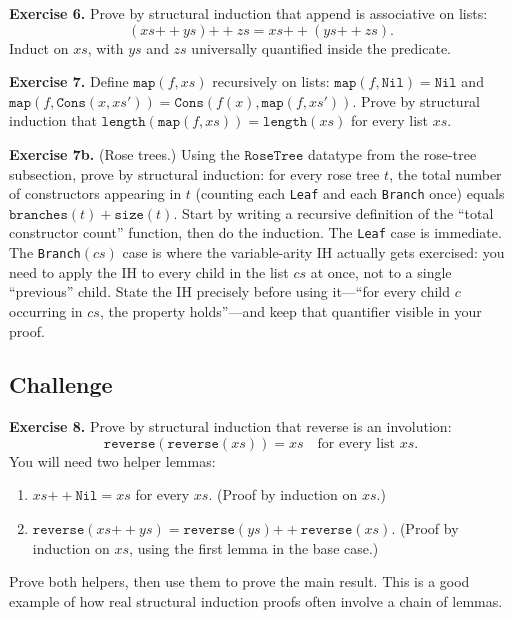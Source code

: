 \documentclass[11pt]{article}
\begin{document}
\bigskip
\textbf{Exercise 6.}\label{ex:m10:6} Prove by structural induction that append is associative on lists:
\[
  (xs \mathbin{++} ys) \mathbin{++} zs = xs \mathbin{++} (ys \mathbin{++} zs).
\]
Induct on $xs$, with $ys$ and $zs$ universally quantified inside the predicate.

\bigskip
\textbf{Exercise 7.}\label{ex:m10:7} Define $\texttt{map}(f, xs)$ recursively on lists: $\texttt{map}(f, \texttt{Nil}) = \texttt{Nil}$ and $\texttt{map}(f, \texttt{Cons}(x, xs')) = \texttt{Cons}(f(x), \texttt{map}(f, xs'))$. Prove by structural induction that $\texttt{length}(\texttt{map}(f, xs)) = \texttt{length}(xs)$ for every list $xs$.

\bigskip
\textbf{Exercise 7b.}\label{ex:m10:7b} (Rose trees.) Using the $\texttt{RoseTree}$ datatype from the rose-tree subsection, prove by structural induction: for every rose tree $t$, the total number of constructors appearing in $t$ (counting each \texttt{Leaf} and each \texttt{Branch} once) equals $\texttt{branches}(t) + \texttt{size}(t)$. Start by writing a recursive definition of the ``total constructor count'' function, then do the induction. The \texttt{Leaf} case is immediate. The \texttt{Branch}$(cs)$ case is where the variable-arity IH actually gets exercised: you need to apply the IH to every child in the list $cs$ at once, not to a single ``previous'' child. State the IH precisely before using it---``for every child $c$ occurring in $cs$, the property holds''---and keep that quantifier visible in your proof.

\subsection*{Challenge}

\textbf{Exercise 8.}\label{ex:m10:8} Prove by structural induction that reverse is an involution:
\[
  \texttt{reverse}(\texttt{reverse}(xs)) = xs \quad \text{for every list } xs.
\]
You will need two helper lemmas:
\begin{enumerate}
  \item $xs \mathbin{++} \texttt{Nil} = xs$ for every $xs$. (Proof by induction on $xs$.)
  \item $\texttt{reverse}(xs \mathbin{++} ys) = \texttt{reverse}(ys) \mathbin{++} \texttt{reverse}(xs)$. (Proof by induction on $xs$, using the first lemma in the base case.)
\end{enumerate}
Prove both helpers, then use them to prove the main result. This is a good example of how real structural induction proofs often involve a chain of lemmas.
\end{document}
